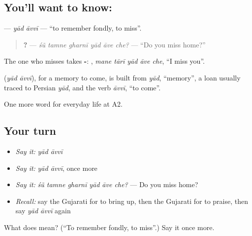 \subsection*{You'll want to know:  }
\textbf{ } — \emph{yād āvvī} — \textquotedblleft{}to remember fondly, to miss\textquotedblright{}.

\begin{quote}
\textbf{     ?} — \emph{śũ tamne gharnī yād āve che?} — \textquotedblleft{}Do you miss home?\textquotedblright{}
\end{quote}

The one who misses takes \textbf{-}: \textbf{    }, \emph{mane tārī yād āve che}, \textquotedblleft{}I miss you\textquotedblright{}.

\begin{cousinweb}
\textbf{ } (\emph{yād āvvī}), for a memory to come, is built from \emph{yād}, \textquotedblleft{}memory\textquotedblright{}, a loan usually traced to Persian \emph{yād}, and the verb \emph{āvvī}, \textquotedblleft{}to come\textquotedblright{}.
\end{cousinweb}

\begin{grammarlens}[title={What you've built}]
One more word for everyday life at A2.
\end{grammarlens}

\subsection*{Your turn}
\begin{itemize}
\raggedright
  \item \emph{Say it:} \emph{yād āvvī}
  \item \emph{Say it:} \emph{yād āvvī}, once more
  \item \emph{Say it:} \emph{śũ tamne gharnī yād āve che?} — Do you miss home?
  \item \emph{Recall:} say the Gujarati for to bring up, then the Gujarati for to praise, then say \emph{yād āvvī} again
\end{itemize}

\begin{tcolorbox}[breakable,colback=teal!4,colframe=teal!35!black,title={Before you move on}]
What does   mean? (\textquotedblleft{}To remember fondly, to miss\textquotedblright{}.) Say it once more.
\end{tcolorbox}
